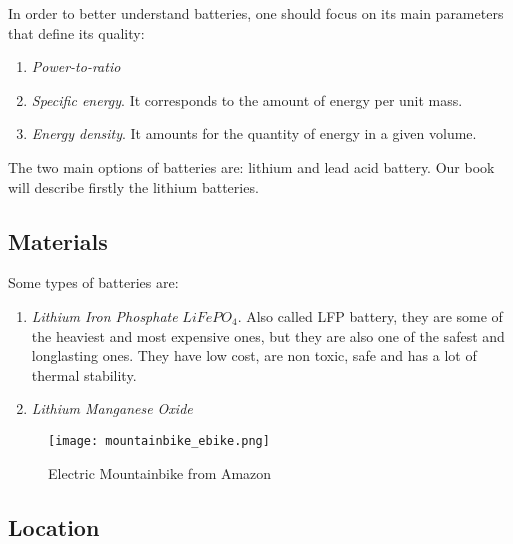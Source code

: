In order to better understand batteries, one should focus on its main parameters that define its quality:



\begin{enumerate}
\item \textit{Power-to-ratio} %
\item \textit{Specific energy}. It corresponds to the amount of energy per unit mass.
\item \textit{Energy density}. It amounts for the quantity of energy in a given volume.
\end{enumerate}
The two main options of batteries are: lithium and lead acid battery. Our book will describe firstly the lithium batteries.

\subsection{Materials}

Some types of batteries are:

\begin{enumerate}
\item \textit{Lithium Iron Phosphate} $LiFePO_4$. Also called LFP battery, they are some of the heaviest and most expensive ones, but they are also one of the safest and longlasting ones. They have low cost, are non toxic, safe and has a lot of thermal stability. 
\item \textit{Lithium Manganese Oxide} %
\end{enumerate}
\begin{figure}
	\centering
	\texttt{[image: mountainbike\_ebike.png]}
	\caption{Electric Mountainbike from Amazon}
	\label{fig:amazon_mountainbike}
\end{figure}
\subsection{Location}




